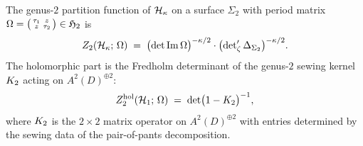 \begin{theorem}%
%
The genus-$2$ partition function of $\mathcal{H}_\kappa$ on a
surface $\Sigma_2$ with period matrix
$\Omega = \bigl(\begin{smallmatrix}\tau_1 & z \\ z & \tau_2
\end{smallmatrix}\bigr)
\in \mathfrak{H}_2$ is
\begin{equation}%
Z_2(\cH_\kappa;\,\Omega)
\;=\;
\bigl(\det\operatorname{Im}\Omega\bigr)^{-\kappa/2}
\cdot
\bigl(\zetareg\Delta_{\Sigma_2}\bigr)^{-\kappa/2}.
\end{equation}
The holomorphic part is the Fredholm determinant of the
genus-$2$ sewing kernel $K_2$ acting on $A^2(D)^{\oplus 2}$:
\begin{equation}%
Z_2^{\mathrm{hol}}(\cH_1;\,\Omega)
\;=\;
\det\bigl(1 - \sewker_2\bigr)^{-1},
\end{equation}
where $K_2$ is the $2 \times 2$ matrix operator on
$A^2(D)^{\oplus 2}$ with entries determined by the sewing data
of the pair-of-pants decomposition.
\end{theorem}

